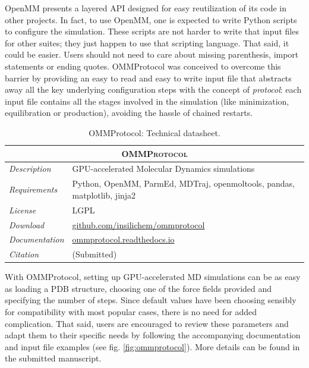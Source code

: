 OpenMM presents a layered API designed for easy reutilization of its code in other projects. In fact, to use OpenMM, one is expected to write Python scripts to configure the simulation. These scripts are not harder to write that input files for other suites; they just happen to use that scripting language. That said, it could be easier. Users should not need to care about missing parenthesis, import statements or ending quotes. OMMProtocol was conceived to overcome this barrier by providing an easy to read and easy to write input file that abstracts away all the key underlying configuration steps with the concept of \textit{protocol}: each input file contains all the stages involved in the simulation (like minimization, equilibration or production), avoiding the hassle of chained restarts.

\begin{table}[hbtp]
	\caption[OMMProtocol: Technical datasheet]{OMMProtocol: Technical datasheet.}
	\footnotesize
	\newcommand{\tableheading}[1]{\multicolumn{2}{c}{\textsc{#1}}}
	\begin{tabularx}{\textwidth}{RL}
		\toprule
		\tableheading{OMMProtocol}\\
		\toprule
		\textit{Description} & GPU-accelerated Molecular Dynamics simulations \\
		\midrule
		\textit{Requirements} & Python, OpenMM, ParmEd, MDTraj, openmoltools, pandas, matplotlib, jinja2 \\
		\midrule
		\textit{License} & LGPL \\
		\midrule
		\textit{Download} & \href{https://github.com/insilichem/ommprotocol}{github.com/insilichem/ommprotocol} \\
		\midrule
		\textit{Documentation} & \href{http://ommprotocol.readthedocs.io}{ommprotocol.readthedocs.io} \\
		\midrule
		\textit{Citation} & (Submitted) \\
		\bottomrule

	\end{tabularx}
\end{table}

With OMMProtocol, setting up GPU-accelerated MD simulations can be as easy as loading a PDB structure, choosing one of the force fields provided and specifying the number of steps. Since default values have been choosing sensibly for compatibility with most popular cases, there is no need for added complication. That said, users are encouraged to review these parameters and adapt them to their specific needs by following the accompanying documentation and input file examples (see fig. \ref{fig:ommprotocol}). More details can be found in the submitted manuscript.\cite{ommprotocol}

